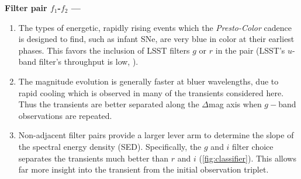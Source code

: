 \documentclass[letterpaper,longauthor,trackchanges,twocolumn,onecolappendix,sort&compress]{aastex62}
\newcommand{\dttwo}{\ensuremath{\Delta T_2}}
\begin{document}
\vspace{1.5mm}
{\bf Filter pair $f_1$-$f_2$ ---}
\vspace{-3mm}
\begin{enumerate}
    \item 
The types of energetic, rapidly rising events which the {\em Presto-Color} cadence is designed to find, such as infant SNe, are very blue in color at their earliest phases. This favors the inclusion of LSST filters $g$ or $r$ in the pair (LSST's $u$-band filter's throughput is low, \citealt{oliver2008}).
\item
The magnitude evolution is generally faster at bluer wavelengths, due to rapid cooling which is observed in many of the transients considered here. Thus the transients are better separated along the $\Delta$mag axis when $g-$band observations are repeated.  
\item
Non-adjacent filter pairs provide a larger lever arm to determine the slope of the spectral energy density (SED).
Specifically, the $g$ and $i$ filter choice separates the transients much better than $r$ and $i$ (\autoref{fig:classifier}).  This allows far more insight into the transient from the initial observation triplet.
\end{enumerate}
 
\end{document}
